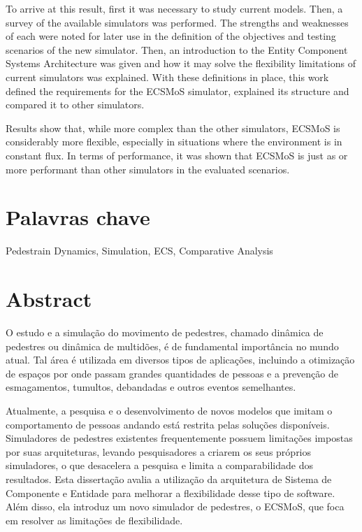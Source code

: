 \documentclass[twoside, 11pt]{article}
\begin{document}
To arrive at this result, first it was necessary to study current models. Then, a survey of the available simulators was performed. The strengths and weaknesses of each were noted for later use in the definition of the objectives and testing scenarios of the new simulator. Then, an introduction to the Entity Component Systems Architecture was given and how it may solve the flexibility limitations of current simulators was explained. With these definitions in place, this work defined the requirements for the ECSMoS simulator, explained its structure and compared it to other simulators. 

Results show that, while more complex than the other simulators, ECSMoS is considerably more flexible, especially in situations where the environment is in constant flux. In terms of performance, it was shown that ECSMoS is just as or more performant than other simulators in the evaluated scenarios. 

\section*{Palavras chave}

Pedestrain Dynamics, Simulation, ECS, Comparative Analysis

\clearpage            %
\null                %
\newpage             %

\section*{Abstract}

O estudo e a simulação do movimento de pedestres, chamado dinâmica de pedestres ou dinâmica de multidões, é de fundamental importância no mundo atual. Tal área é utilizada em diversos tipos de aplicações, incluindo a otimização de espaços por onde passam grandes quantidades de pessoas e a prevenção de esmagamentos, tumultos, debandadas e outros eventos semelhantes.

Atualmente, a pesquisa e o desenvolvimento de novos modelos que imitam o comportamento de pessoas andando está restrita pelas soluções disponíveis. Simuladores de pedestres existentes frequentemente possuem limitações impostas por suas arquiteturas, levando pesquisadores a criarem os seus próprios simuladores, o que desacelera a pesquisa e limita a comparabilidade dos resultados. Esta dissertação avalia a utilização da arquitetura de Sistema de Componente e Entidade para melhorar a flexibilidade desse tipo de software. Além disso, ela introduz um novo simulador de pedestres, o ECSMoS, que foca em resolver as limitações de flexibilidade.
\end{document}
